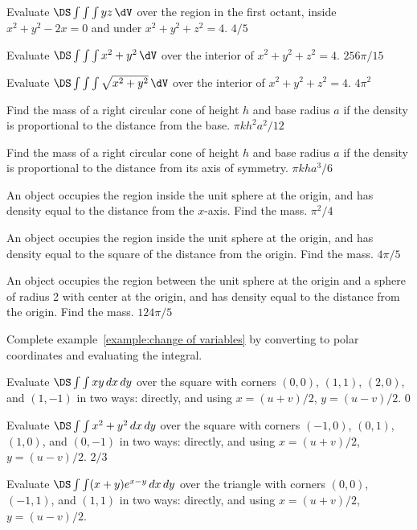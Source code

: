 \begin{multicols}{2}
\problem Evaluate $\DS\int\int\int yz\,\dV $ %
over the region in the first octant, inside $x^2+y^2-2x=0$ and 
under $x^2+y^2+z^2=4$.
\answer
$4/5$
\endanswer

\problem Evaluate $\DS\int\int\int x^2+y^2\,\dV $ %
over the interior of $x^2+y^2+z^2=4$.
\answer
$256\pi/15$
\endanswer

\problem Evaluate $\DS\int\int\int \sqrt{x^2+y^2}\,\dV $ %
over the interior of $x^2+y^2+z^2=4$.
\answer
$4\pi^2$
\endanswer

\problem Find the mass of a right circular cone of height $h$ and %
base radius $a$ if the density is proportional to the distance from
the base.
\answer
$\pi kh^2a^2/12$
\endanswer

\problem Find the mass of a right circular cone of height $h$ and %
base radius $a$ if the density is proportional to the distance from
its axis of symmetry.
\answer
$\pi kha^3/6$
\endanswer

\problem An object occupies the region inside the unit sphere at the %
origin, and has density equal to the distance from the $x$-axis. Find
the mass.
\answer
$\pi^2/4$
\endanswer

\problem An object occupies the region inside the unit sphere at the %
origin, and has density equal to the square of the distance from the
origin. Find the mass.
\answer
$4\pi/5$
\endanswer

\problem An object occupies the region between the unit sphere at the %
origin and a sphere of radius 2 with center at the origin, and has
density equal to the distance from the origin. Find the mass.
\answer
$124\pi/5$
\endanswer





\problem Complete example~\ref{example:change of variables} by %
converting to polar coordinates and evaluating the integral.

\problem Evaluate $\DS\int\int xy\,dx\,dy$ over the square %
with corners $(0,0)$, $(1,1)$, $(2,0)$, and $(1,-1)$ in two ways:
directly, and using $x=(u+v)/2$, $y=(u-v)/2$.
\answer
$0$
\endanswer

\problem Evaluate $\DS\int\int x^2+y^2\,dx\,dy$ over the square %
with corners $(-1,0)$, $(0,1)$, $(1,0)$, and $(0,-1)$ in two ways:
directly, and using $x=(u+v)/2$, $y=(u-v)/2$.
\answer
$2/3$
\endanswer

\problem Evaluate $\DS\int\int (x+y)e^{x-y}\,dx\,dy$ over the triangle %
with corners $(0,0)$, $(-1,1)$, and $(1,1)$ in two ways:
directly, and using $x=(u+v)/2$, $y=(u-v)/2$.


\end{multicols}
